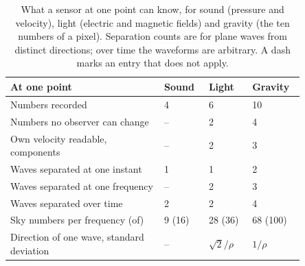 \begin{table}
\centering
\begin{tabular}{p{0.46\linewidth}p{0.12\linewidth}p{0.13\linewidth}p{0.14\linewidth}}
At one point & Sound & Light & Gravity \\ \hline
Numbers recorded & 4 & 6 & 10 \\
Numbers no observer can change & -- & 2 & 4 \\
Own velocity readable, components & -- & 2 & 3 \\
Waves separated at one instant & 1 & 1 & 2 \\
Waves separated at one frequency & -- & 2 & 3 \\
Waves separated over time & 2 & 2 & 4 \\
Sky numbers per frequency (of) & 9 (16) & 28 (36) & 68 (100) \\
Direction of one wave, standard deviation & -- & $\sqrt2/\rho$ & $1/\rho$ \\
\end{tabular}
\caption{What a sensor at one point can know, for sound (pressure and velocity),
light (electric and magnetic fields) and gravity (the ten numbers of a pixel).
Separation counts are for plane waves from distinct directions; over time the
waveforms are arbitrary. A dash marks an entry that does not
apply.}\label{tab:one-pixel}
\end{table}
